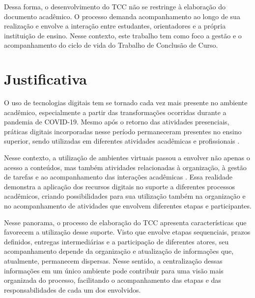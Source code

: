 Dessa forma, o desenvolvimento do TCC não se restringe à elaboração do documento acadêmico. O processo demanda acompanhamento ao longo de sua realização e envolve a interação entre estudantes, orientadores e a própria instituição de ensino. Nesse contexto, este trabalho tem como foco a gestão e o acompanhamento do ciclo de vida do Trabalho de Conclusão de Curso.


\section{Justificativa}

O uso de tecnologias digitais tem se tornado cada vez mais presente no ambiente acadêmico, especialmente a partir das transformações ocorridas durante a pandemia de COVID-19. Mesmo após o retorno das atividades presenciais, práticas digitais incorporadas nesse período permaneceram presentes no ensino superior, sendo utilizadas em diferentes atividades acadêmicas e profissionais \cite{Carneiro2026}.

Nesse contexto, a utilização de ambientes virtuais passou a envolver não apenas o acesso a conteúdos, mas também atividades relacionadas à organização, à gestão de tarefas e ao acompanhamento das interações acadêmicas  \cite{Carneiro2026}. Essa realidade demonstra a aplicação dos recursos digitais no suporte a diferentes processos acadêmicos, criando possibilidades para sua utilização também na organização e no acompanhamento de atividades que envolvem diferentes etapas e participantes.

Nesse panorama, o processo de elaboração do TCC apresenta características que favorecem a utilização desse suporte. Visto que envolve etapas sequenciais, prazos definidos, entregas intermediárias e a participação de diferentes atores, seu acompanhamento depende da organização e atualização de informações que, atualmente, permanecem dispersas. Nesse sentido, a centralização dessas informações em um único ambiente pode contribuir para uma visão mais organizada do processo, facilitando o acompanhamento das etapas e das responsabilidades de cada um dos envolvidos.


